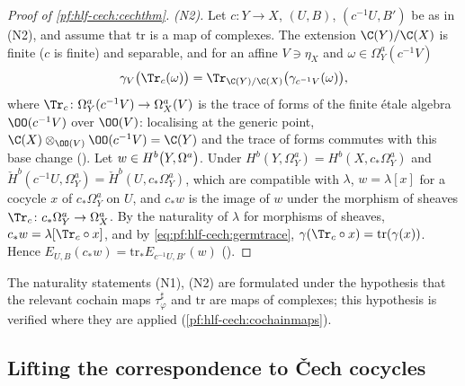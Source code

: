 \begin{proof}[Proof of \cref{pf:hlf-cech:cechthm}]
\emph{(N2).} Let $c\colon Y\to X$, $(U,B)$, $(c^{-1}U,B')$ be as in (N2), and assume that $\mathrm{tr}$ is a map of complexes. The extension
$\C(Y)/\C(X)$ is finite ($c$ is finite) and separable, and for an affine $V\ni\eta_X$ and $\omega\in\Omega^a_Y(c^{-1}V)$
\begin{equation}\label{eq:pf:hlf-cech:germtrace}
  \gamma_V\bigl(\Tr_c(\omega)\bigr)=\Tr_{\C(Y)/\C(X)}\bigl(\gamma_{c^{-1}V}(\omega)\bigr),
\end{equation}
where $\Tr_c\colon\Omega^a_Y(c^{-1}V)\to\Omega^a_X(V)$ is the trace of forms of the finite \'etale algebra $\OO(c^{-1}V)$ over $\OO(V)$: localising
at the generic point, $\C(X)\otimes_{\OO(V)}\OO(c^{-1}V)=\C(Y)$ and the trace of forms commutes with this base change
(). Let $w\in\hlfcechHdg{Y}{a}{b}$. Under $H^b(Y,\Omega^a_Y)=H^b(X,c_*\Omega^a_Y)$ and
$\check H^b(c^{-1}U,\Omega^a_Y)=\check H^b(U,c_*\Omega^a_Y)$, which are compatible with $\lambda$, $w=\lambda[x]$ for a cocycle $x$ of $c_*\Omega^a_Y$
on $U$, and $c_*w$ is the image of $w$ under the morphism of sheaves $\Tr_c\colon c_*\Omega^a_Y\to\Omega^a_X$. By the naturality of $\lambda$ for
morphisms of sheaves, $c_*w=\lambda[\Tr_c\circ x]$, and by \eqref{eq:pf:hlf-cech:germtrace}, $\gamma(\Tr_c\circ x)=\mathrm{tr}(\gamma(x))$. Hence
$E_{U,B}(c_*w)=\mathrm{tr}_*E_{c^{-1}U,B'}(w)$ ().
\end{proof}

\begin{remark}\label{pf:hlf-cech:rem:cech}
The naturality statements (N1), (N2) are formulated under the hypothesis that the relevant cochain maps $\tau^\sharp_\varphi$ and
$\mathrm{tr}$ are maps of complexes; this hypothesis is verified where they are applied (\cref{pf:hlf-cech:cochainmaps}).
\end{remark}

\subsection{Lifting the correspondence to \v{C}ech cocycles}\label{sec:pf:hlf-cech:family}

